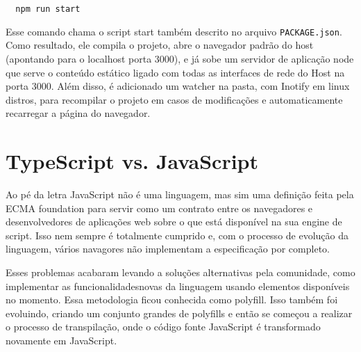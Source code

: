 \documentclass[rel_mlp]{iiufrgs}
\begin{document}
\begin{lstlisting}
  npm run start
\end{lstlisting}

Esse comando chama o script start também descrito no arquivo \verb|PACKAGE.json|. Como resultado, ele compila o projeto, abre o navegador padrão do host (apontando para o localhost porta 3000), e já sobe um servidor de aplicação node que serve o conteúdo estático ligado com todas as interfaces de rede do Host na porta 3000. Além disso, é adicionado um watcher na pasta, com Inotify em linux distros, para recompilar o projeto em casos de modificações e automaticamente recarregar a página do navegador.

\section{TypeScript vs. JavaScript}
Ao pé da letra JavaScript não é uma linguagem, mas sim uma definição feita pela ECMA foundation para servir como um contrato entre os navegadores e desenvolvedores de aplicações web sobre o que está disponível na sua engine de script. Isso nem sempre é totalmente cumprido e, com o processo de evolução da linguagem, vários navagores não implementam a especificação por completo. \par
Esses problemas acabaram levando a soluções alternativas pela comunidade, como implementar as funcionalidadesnovas da linguagem usando elementos disponíveis no momento. Essa metodologia ficou conhecida como polyfill. Isso também foi evoluindo, criando um conjunto grandes de polyfills e então se começou a realizar o processo de transpilação, onde o código fonte JavaScript é transformado novamente em JavaScript.
\end{document}
